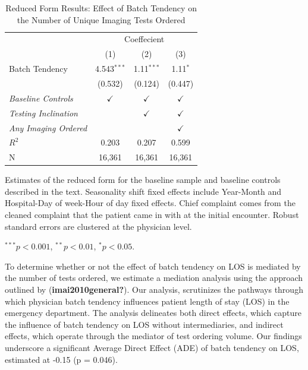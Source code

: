 \documentclass{article}
\begin{document}
\begin{table}[!htbp] \centering 
  \caption{Reduced Form Results: Effect of Batch Tendency on the Number of Unique Imaging Tests Ordered}
  \label{table:reduced_form}
  \begin{tabularx}{5.5in}{Xccc} %
  \toprule
   & \multicolumn{3}{c}{Coeffecient} \\
  \cmidrule{2-4}
   & (1) & (2) & (3) \\
  \midrule
  Batch Tendency  & 4.543$^{***}$ & 1.11$^{***}$ & 1.11$^{*}$ \\ 
   & (0.532) & (0.124) & (0.447) \\
  \textit{Baseline Controls} &  $\checkmark$ & $\checkmark$ & $\checkmark$ \\ 
  \textit{Testing Inclination}  & & $\checkmark$ & $\checkmark$ \\
  \textit{Any Imaging Ordered} & & & $\checkmark$ \\ %
  \midrule
  $R^2$ & 0.203 & 0.207 & 0.599 \\ 
  N & 16,361 & 16,361 & 16,361 \\ 
  \bottomrule
  \end{tabularx}
  \begin{tablenotes}
  \small
  \item Estimates of the reduced form for the baseline sample and baseline controls described in the text. Seasonality shift fixed effects include Year-Month and Hospital-Day of week-Hour of day fixed effects. Chief complaint comes from the cleaned complaint that the patient came in with at the initial encounter. Robust standard errors are clustered at the physician level.
  \item $^{***} p < 0.001$, $^{**} p < 0.01$, $^{*} p < 0.05$.
  \end{tablenotes}
\end{table}

To determine whether or not the effect of batch tendency on LOS is
mediated by the number of tests ordered, we estimate a mediation
analysis using the approach outlined by (\textbf{imai2010general?}). Our
analysis, scrutinizes the pathways through which physician batch
tendency influences patient length of stay (LOS) in the emergency
department. The analysis delineates both direct effects, which capture
the influence of batch tendency on LOS without intermediaries, and
indirect effects, which operate through the mediator of test ordering
volume. Our findings underscore a significant Average Direct Effect
(ADE) of batch tendency on LOS, estimated at -0.15 (p = 0.046).
\end{document}
